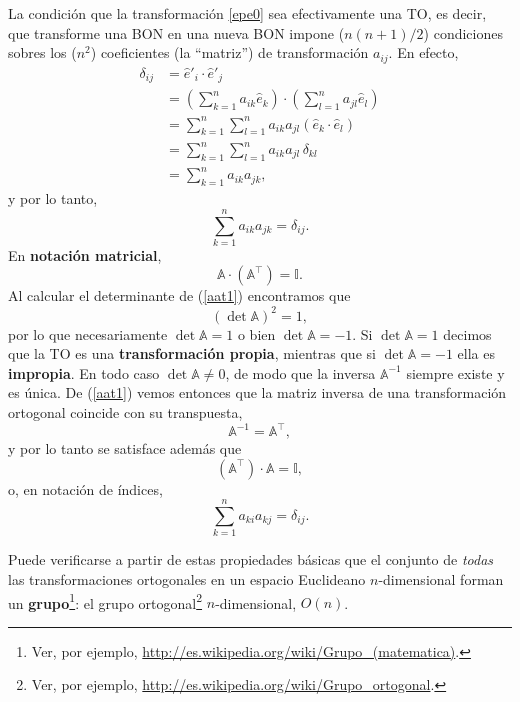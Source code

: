 La condición que la transformación \eqref{epe0} sea efectivamente una TO, es decir, que transforme una BON en una nueva BON impone ($n(n+1)/2$) condiciones sobres los ($n^2$) coeficientes (la ``matriz'') de transformación $a_{ij}$. En efecto,
\begin{align}
\delta_{ij} &= \hat{e}'_i\cdot \hat{e}'_j \\
&= \left(\sum_{k=1}^na_{ik}\hat{e}_k\right)\cdot \left(\sum_{l=1}^na_{jl}\hat{e}_l\right) \\
&=\sum_{k=1}^n\sum_{l=1}^n a_{ik}a_{jl}\left(\hat{e}_k\cdot \hat{e}_l\right) \\
&= \sum_{k=1}^n\sum_{l=1}^na_{ik}a_{jl}\,\delta_{kl} \\
&= \sum_{k=1}^na_{ik}a_{jk}, 
\end{align}
y por lo tanto,
\begin{equation}\label{aad1}
\boxed{\sum_{k=1}^n a_{ik}a_{jk}=\delta_{ij}.}
\end{equation}
En \textbf{notación matricial}, 
\begin{equation} \label{aat1}
\mathbb{A}\cdot(\mathbb{A}^\top)=\mathbb{I}.
\end{equation}
Al calcular el determinante de (\ref{aat1}) encontramos que
\begin{equation}
(\det\mathbb{A})^2=1,
\end{equation}
por lo que necesariamente $\det\mathbb{A}=1$ o bien $\det\mathbb{A}=-1$. Si $\det\mathbb{A}=1$ decimos que la TO es una \textbf{transformación propia}, mientras que si $\det\mathbb{A}=-1$ ella es \textbf{impropia}. En todo caso $\det\mathbb{A}\neq 0$, de modo que la inversa $\mathbb{A}^{-1}$ siempre existe y es única. De  (\ref{aat1}) vemos entonces que la matriz inversa de una transformación ortogonal coincide con su transpuesta,
\begin{equation}\label{corto}
\mathbb{A}^{-1}=\mathbb{A}^\top ,
\end{equation}
y por lo tanto se satisface además que
\begin{equation} \label{ata1}
(\mathbb{A}^\top)\cdot\mathbb{A}=\mathbb{I},
\end{equation}
o, en notación de índices,
\begin{equation}\label{aakd2}
\boxed{\sum_{k=1}^n a_{ki}a_{kj}=\delta_{ij}.}
\end{equation}

Puede verificarse a partir de estas propiedades básicas que el conjunto de \textit{todas} las transformaciones ortogonales en un espacio Euclideano $n$-dimensional forman un \textbf{grupo}\footnote{Ver, por ejemplo, \url{http://es.wikipedia.org/wiki/Grupo_(matematica)}.}: el grupo ortogonal\footnote{Ver, por ejemplo, \url{http://es.wikipedia.org/wiki/Grupo_ortogonal}.} $n$-dimensional, $O(n)$.

